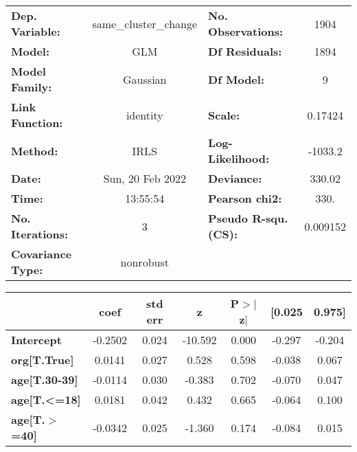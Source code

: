 \begin{center}
\begin{tabular}{lclc}
\toprule
\textbf{Dep. Variable:}            & same\_cluster\_change & \textbf{  No. Observations:  } &     1904    \\
\textbf{Model:}                    &          GLM          & \textbf{  Df Residuals:      } &     1894    \\
\textbf{Model Family:}             &        Gaussian       & \textbf{  Df Model:          } &        9    \\
\textbf{Link Function:}            &        identity       & \textbf{  Scale:             } &   0.17424   \\
\textbf{Method:}                   &          IRLS         & \textbf{  Log-Likelihood:    } &   -1033.2   \\
\textbf{Date:}                     &    Sun, 20 Feb 2022   & \textbf{  Deviance:          } &    330.02   \\
\textbf{Time:}                     &        13:55:54       & \textbf{  Pearson chi2:      } &     330.    \\
\textbf{No. Iterations:}           &           3           & \textbf{  Pseudo R-squ. (CS):} &  0.009152   \\
\textbf{Covariance Type:}          &       nonrobust       & \textbf{                     } &             \\
\bottomrule
\end{tabular}
\begin{tabular}{lcccccc}
                                   & \textbf{coef} & \textbf{std err} & \textbf{z} & \textbf{P$> |$z$|$} & \textbf{[0.025} & \textbf{0.975]}  \\
\midrule
\textbf{Intercept}                 &      -0.2502  &        0.024     &   -10.592  &         0.000        &       -0.297    &       -0.204     \\
\textbf{org[T.True]}               &       0.0141  &        0.027     &     0.528  &         0.598        &       -0.038    &        0.067     \\
\textbf{age[T.30-39]}              &      -0.0114  &        0.030     &    -0.383  &         0.702        &       -0.070    &        0.047     \\
\textbf{age[T.<=18]}               &       0.0181  &        0.042     &     0.432  &         0.665        &       -0.064    &        0.100     \\
\textbf{age[T.$>$=40]}             &      -0.0342  &        0.025     &    -1.360  &         0.174        &       -0.084    &        0.015     \\

\end{tabular}
\end{center}
